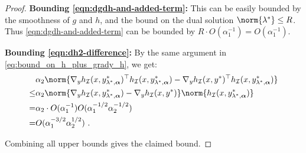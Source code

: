\begin{proof}
\noindent\textbf{Bounding \cref{eqn:dgdh-and-added-term}:}
This can be easily bounded by the smoothness of $g$ and $h$, and the bound on the dual solution $\norm{\lambda^*} \leq R$.
Thus \cref{eqn:dgdh-and-added-term} can be bounded by $R \cdot O({\alpha_1^{-1}}) = O({\alpha_1^{-1}})$.

\noindent\textbf{Bounding \cref{eqn:dh2-difference}:}
By the same argument in \cref{eq:bound_on_h_plus_grady_h}, we get:
\begin{align}
    & \alpha_2 \norm{\nabla_y h_\mathcal{I}(x,y_{\lambda^*,\boldsymbol{\alpha}}^*)^\top h_\mathcal{I}(x,y_{\lambda^*,\boldsymbol{\alpha}}^*) - \nabla_y h_\mathcal{I}(x,y^*)^\top h_\mathcal{I}(x,y_{\lambda^*,\boldsymbol{\alpha}}^*) } \nonumber \\
    \leq & \alpha_2 \norm{\nabla_y h_\mathcal{I}(x,y_{\lambda^*,\boldsymbol{\alpha}}^*) - \nabla_y h_\mathcal{I}(x,y^*)} \norm{h_\mathcal{I}(x,y_{\lambda^*,\boldsymbol{\alpha}}^*)} \nonumber \\
    = &  \alpha_2\cdot O({\alpha_1^{-1}}) O({{\alpha_1^{-1/2} \alpha_2^{-1/2}}}) \nonumber \\
    = & O(\alpha_1^{-3/2}\alpha_2^{1/2}) ~. \nonumber
\end{align}

Combining all upper bounds gives the claimed bound. 
\end{proof}

